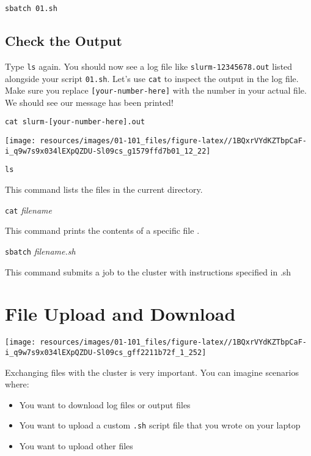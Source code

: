 \documentclass[
]{book}
\providecommand{\tightlist}{%
  \setlength{\itemsep}{0pt}\setlength{\parskip}{0pt}}
\begin{document}
\begin{verbatim}
sbatch 01.sh
\end{verbatim}

\hypertarget{check-the-output}{%
\section{Check the Output}\label{check-the-output}}

Type \texttt{ls} again. You should now see a log file like \texttt{slurm-12345678.out} listed alongside your script \texttt{01.sh}. Let's use \texttt{cat} to inspect the output in the log file. Make sure you replace \texttt{{[}your-number-here{]}} with the number in your actual file. We should see our message has been printed!

\begin{verbatim}
cat slurm-[your-number-here].out
\end{verbatim}

\texttt{[image: resources/images/01-101\_files/figure-latex//1BQxrVYdKZTbpCaF-i\_q9w7s9x034lEXpQZDU-Sl09cs\_g1579ffd7b01\_12\_22]}

\texttt{ls}

This command lists the files in the current directory.

\texttt{cat} \emph{filename}

This command prints the contents of a specific file .

\texttt{sbatch} \emph{filename.sh}

This command submits a job to the cluster with instructions specified in .sh

\hypertarget{file-upload-and-download}{%
\chapter{File Upload and Download}\label{file-upload-and-download}}

\texttt{[image: resources/images/01-101\_files/figure-latex//1BQxrVYdKZTbpCaF-i\_q9w7s9x034lEXpQZDU-Sl09cs\_gff2211b72f\_1\_252]}

Exchanging files with the cluster is very important. You can imagine scenarios where:

\begin{itemize}
\tightlist
\item
  You want to download log files or output files
\item
  You want to upload a custom \texttt{.sh} script file that you wrote on your laptop
\item
  You want to upload other files
\end{itemize}
\end{document}
